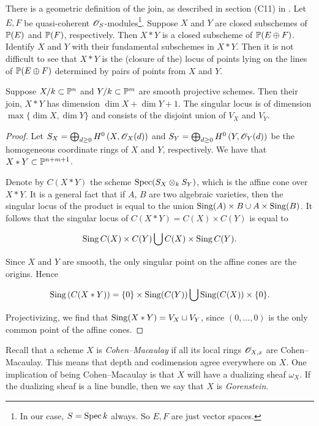 There is a geometric definition of the join, as described in section (C11) in \cite{altman_joins}. Let $E,F$ be quasi-coherent $\OO_S$-modules\footnote{In our case, $S=\Spec k$  always. So $E,F$ are just vector spaces.}. Suppose $X$ and $Y$ are closed subschemes of $\P(E)$ and $\P(F)$, respectively. Then $X\ast Y$ is a closed subscheme of $\P(E \oplus F)$. Identify $X$ and $Y$ with their fundamental subschemes in $X \ast Y$. Then it is not difficult to see that $X \ast Y$ is the (closure of the) locus of points lying on the lines of $\P(E \oplus F)$ determined by pairs of points from $X$ and $Y$. 

\begin{proposition}
\label{lemma:join}
Suppose $X/k \subset \P^n$ and $Y/k \subset \P^m$ are smooth projective schemes. Then their join, $X \ast Y$ has dimension $\dim X+\dim Y+1$. The singular locus is of dimension $\max\{\dim X,\dim Y\}$ and consists of the disjoint union of $V_X$ and $V_Y$.
\end{proposition}
\begin{proof}
Let $S_X = \bigoplus_{d \geq 0} H^0\left(X,\OO_X(d)\right)$ and $S_Y = \bigoplus_{d \geq 0} H^0\left(Y,\OO_Y(d)\right)$ be the homogeneous coordinate rings of $X$ and $Y$, respectively. We have that $X \ast Y \subset \P^{n+m+1}$. 

Denote by $C(X \ast Y)$ the scheme $\Spec (S_X \otimes_k S_Y)$, which is the affine cone over $X \ast Y$. It is a general fact that if $A$, $B$ are two algebraic varieties, then the singular locus of the product is equal to the union $\Sing (A) \times B \cup A \times \Sing(B)$. It follows that the singular locus of $C(X \ast Y) = C(X) \times C(Y)$ is equal to

\[
\Sing C(X) \times C(Y) \bigcup C(X) \times \Sing C(Y).
\]

Since $X$ and $Y$ are smooth, the only singular point on the affine cones are the origins. Hence

$$
\Sing\left(C(X \ast Y)\right) = \{0\} \times \Sing(C(Y)) \bigcup \Sing(C(X)) \times \{ 0\}.
$$

Projectivizing, we find that $\Sing(X \ast Y) = V_X \sqcup V_Y$, since $(0,\ldots,0)$ is the only common point of the affine cones. 
\end{proof}

Recall that a scheme $X$ is \emph{Cohen--Macaulay} if all its local rings $\OO_{X,x}$ are Cohen--Macaulay. This means that depth and codimension agree everywhere on $X$. One implication of being Cohen--Macaulay is that $X$ will have a dualizing sheaf $\omega_X$. If the dualizing sheaf is a line bundle, then we say that $X$ is \emph{Gorenstein}.

